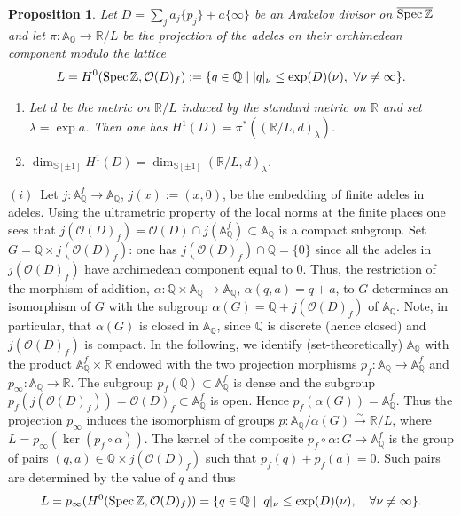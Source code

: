 \documentclass[cupthm]{CUP-JNL-JMJ}
\numberwithin{equation}{section}
\theoremstyle{cupplain}
\newtheorem{proposition}[theorem]{Proposition}
\theoremstyle{cupdefinition}
\theoremstyle{cupremark}
\theoremstyle{cupproof}
\def\A{{\mathbb A}}
\def\Q{{\mathbb Q}}
\def\R{{\mathbb R}}
\def\S{{\mathbb S}}
\def\Z{{\mathbb Z}}
\def\cO{{\mathcal O}}
\def\Spec{{\rm Spec\,}}
\def\sss{{\S}}
\def\spm{{\sss[\pm 1]}}
\def\spzb{{\overline{\Spec\Z}}}
\begin{document}
\begin{appendix}
 \begin{proposition}\label{thedimh1} Let $D=\sum_j a_j\{p_j\} + a\{\infty\}$ be an Arakelov divisor on $\spzb$ and let $\pi:\A_\Q\to \R/L$ be the projection of the  adeles on their archimedean component modulo the lattice
 \begin{equation}\label{weil6}
 L= H^0(\Spec\Z,\cO(D)_f):=\{q \in \Q\mid \vert q\vert_\nu \leq \exp(D)(\nu),~\forall \nu\neq \infty \}.
\end{equation}
\begin{enumerate}
\item[(i)] Let $d$ be the metric on $\R/L$ induced by the standard metric on $\R$ and set $\lambda=\exp a$. Then one has $H^1(D)=\pi^*((\R/L,d)_\lambda)$. 
\item[(ii)] 
 	$\dim_{\spm}H^1(D)=\dim_{\spm}(\R/L,d)_\lambda$. 	
 	\end{enumerate}
 \end{proposition}
\proof 
$(i)$~Let $j: \A_\Q^f\to \A_\Q$, $j(x):= (x,0)$, be the embedding of  finite adeles in adeles. Using the ultrametric property of  the local norms at  the finite places one sees that $j(\cO(D)_f)=\cO(D)\cap j(\A_\Q^f)\subset \A_\Q$ is a compact subgroup. Set $G=\Q\times j(\cO(D)_f)$: one has $j(\cO(D)_f)\cap\Q=\{0\}$ since all the adeles in $j(\cO(D)_f)$ have archimedean component equal to $0$. Thus, the  restriction  of the morphism of  addition,  $\alpha:\Q\times \A_\Q \to \A_\Q$, $\alpha(q,a)=q+a$,  to $G$   determines an isomorphism of $G$   with  the  subgroup  $\alpha(G)=\Q+j(\cO(D)_f)$ of $\A_\Q$. Note, in particular, that $\alpha(G)$  is closed  in $\A_\Q$, since $\Q$ is discrete  (hence closed) and $j(\cO(D)_f)$ is compact. In the following, we identify (set-theoretically)  $\A_\Q$ with the product $\A^f_\Q\times \R$  endowed with the two projection morphisms   $p_f: \A_\Q\to \A^f_\Q$ and $p_\infty: \A_\Q\to \R$. The subgroup $p_f(\Q)\subset \A^f_\Q$ is dense and the subgroup $p_f(j(\cO(D)_f))=\cO(D)_f\subset \A^f_\Q$ is open.  Hence   $p_f(\alpha(G))=\A^f_\Q$. Thus  the projection $p_\infty$ induces   the isomorphism  of groups   $p:\A_\Q/\alpha(G)\stackrel{\sim}{\to} \R/L$, where $L=p_\infty(\ker(p_f\circ \alpha)) $. The kernel  of the composite $p_f\circ \alpha: G\to \A_\Q^f$  is the group of pairs $(q,a)\in \Q\times j(\cO(D)_f)$ such that $p_f(q)+p_f(a)=0$. Such pairs are determined by the value of $q$ and thus 
\begin{equation}\label{weil6}
L=p_\infty(H^0(\Spec\Z,\cO(D)_f))=\{q \in \Q\mid \vert q\vert_\nu \leq \exp(D)(\nu), \quad\forall \nu\neq \infty \}.

\end{equation}
\end{appendix}
\end{document}
